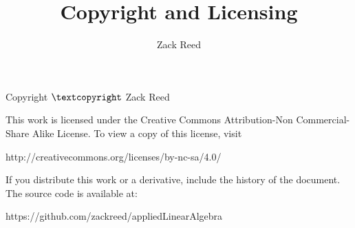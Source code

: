 \documentclass{ximera}
\author{Zack Reed}
\title{Copyright and Licensing}
\begin{document}
\begin{abstract}

\end{abstract}
\maketitle

Copyright $\textcopyright$ Zack Reed

This work is licensed under the Creative Commons Attribution-Non Commercial-Share Alike License. To view a copy of this license,
visit 

http://creativecommons.org/licenses/by-nc-sa/4.0/

If you distribute this work or a derivative, include the history of the document. The source code is available at: 

https://github.com/zackreed/appliedLinearAlgebra
\end{document}
